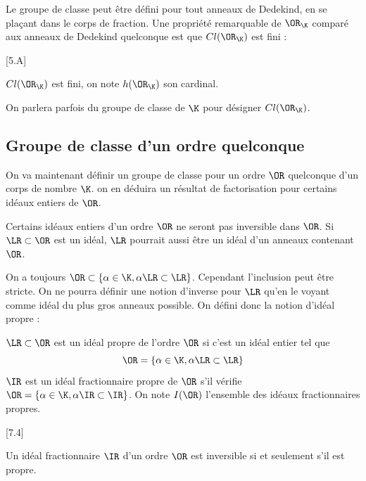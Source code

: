 Le groupe de classe peut être défini pour tout anneaux de Dedekind, en se plaçant dans le corps de fraction. Une propriété remarquable de $\OR_{\K}$ comparé aux anneaux de Dedekind quelconque est que $Cl(\OR_{\K})$ est fini :

\begin{Prop}\cite{Cox}[5.A]
	
	$Cl(\OR_{\K})$ est fini, on note $h(\OR_{\K})$ son cardinal. 
\end{Prop} 

On parlera parfois du groupe de classe de $\K$ pour désigner $Cl(\OR_{\K})$.







\subsection{Groupe de classe d'un ordre quelconque}

On va maintenant définir un groupe de classe pour un ordre $\OR$ quelconque d'un corps de nombre $\K$. on en déduira un résultat de factorisation pour certains idéaux entiers de $\OR$.

Certains idéaux entiers d'un ordre $\OR$ ne seront pas inversible dans $\OR$. Si $\LR\subset\OR$ est un idéal, $\LR$ pourrait aussi être un idéal d'un anneaux contenant $\OR$. 

On a toujours $\OR\subset\left\lbrace \alpha\in\K, \alpha\LR\subset\LR\right\rbrace$. Cependant l'inclusion peut être stricte. On ne pourra définir une notion d'inverse pour $\LR$ qu'en le voyant comme idéal du plus gros anneaux possible. On défini donc la notion d'idéal propre :

\begin{Def}
	$\LR\subset\OR$ est un idéal propre de l'ordre $\OR$ si c'est un idéal entier tel que
	\begin{equation*}
		\OR = \left\lbrace \alpha\in\K, \alpha\LR\subset\LR\right\rbrace
	\end{equation*} 
	$\IR$ est un idéal fractionnaire propre de $\OR$ s'il vérifie $\OR = \left\lbrace \alpha\in\K, \alpha\IR\subset\IR\right\rbrace$. On note $I(\OR)$ l'ensemble des idéaux fractionnaires propres.
\end{Def}

\begin{Prop}\cite{Cox}[7.4]
	
	Un idéal fractionnaire $\IR$ d'un ordre $\OR$ est inversible si et seulement s'il est propre.
\end{Prop}

